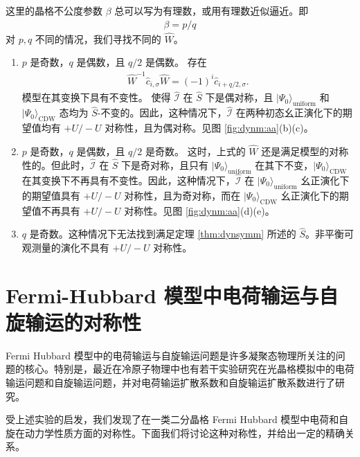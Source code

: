 这里的晶格不公度参数 $\beta$ 总可以写为有理数，或用有理数近似逼近。即 
\begin{align}
\beta=p/q
\end{align}
对 $p,q$ 不同的情况，我们寻找不同的 $\hat{W}$。
\begin{enumerate}
\item $p$ 是奇数，$q$ 是偶数，且 $q/2$ 是偶数。
存在
\begin{align}
\hat{W}^{-1}\hat{c}_{i,\sigma}\hat{W}=(-1)^{i}\hat{c}_{i+q/2,\sigma}.  \label{W3} 
\end{align}
模型在其变换下具有不变性。
使得 $\hat{\mathcal{I}}$ 在 $\hat{S}$ 下是偶对称，且 $|\Psi_0\rangle_{\text{uniform}}$ 和 $|\Psi_0\rangle_{\text{CDW}}$ 态均为 $\hat{S}$-不变的。因此，这种情况下，$\hat{\mathcal{I}}$ 在两种初态幺正演化下的期望值均有 $+U/-U$ 对称性，且为偶对称。见图 \ref{fig:dynm:aa}(b)(c)。

\item $p$ 是奇数，$q$ 是偶数，且 $q/2$ 是奇数。
这时，上式的 $\hat{W}$ 还是满足模型的对称性的。但此时，$\hat{\mathcal{I}}$ 在 $\hat{S}$ 下是奇对称，且只有 $|\Psi_0\rangle_{\text{uniform}}$ 在其下不变，$|\Psi_0\rangle_{\text{CDW}}$ 在其变换下不再具有不变性。因此，这种情况下，$\hat{\mathcal{I}}$ 在 $|\Psi_0\rangle_{\text{uniform}}$ 幺正演化下的期望值具有 $+U/-U$ 对称性，且为奇对称，而在 $|\Psi_0\rangle_{\text{CDW}}$ 幺正演化下的期望值不再具有 $+U/-U$ 对称性。见图 \ref{fig:dynm:aa}(d)(e)。

\item $q$ 是奇数。这种情况下无法找到满足定理 \ref{thm:dynsymm} 所述的 $\hat{S}$。非平衡可观测量的演化不具有 $+U/-U$ 对称性。
\end{enumerate}



\section{Fermi-Hubbard 模型中电荷输运与自旋输运的对称性}\label{sec:diffusion}

Fermi Hubbard 模型中的电荷输运与自旋输运问题是许多凝聚态物理所关注的问题的核心。特别是，最近在冷原子物理中也有若干实验研究在光晶格模拟中的电荷输运问题\cite{charge-diffusion}和自旋输运问题\cite{spin-diffusion}，并对电荷输运扩散系数和自旋输运扩散系数\cite{spin-diffusion}进行了研究。

受上述实验的启发，我们发现了在一类二分晶格 Fermi Hubbard 模型中电荷和自旋在动力学性质方面的对称性\cite{diffusion}。下面我们将讨论这种对称性，并给出一定的精确关系。

